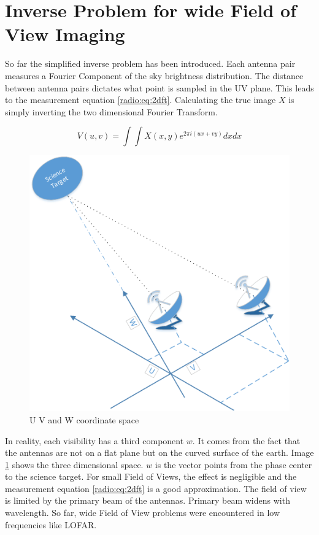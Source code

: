 \section{Inverse Problem for wide Field of View Imaging} \label{radio}
So far the simplified inverse problem has been introduced. Each antenna pair measures a Fourier Component of the sky brightness distribution. The distance between antenna pairs dictates what point is sampled in the UV plane. This leads to the measurement equation \eqref{radio:eq:2dft}. Calculating the true image $X$ is simply inverting the two dimensional Fourier Transform.

\begin{equation}\label{radio:eq:2dft}
V(u, v) = \int\int X(x, y) e^{2 \pi i (ux+vy)} dx dx
\end{equation}

\begin{figure}
	\vspace{-15pt}
	\centering
	\includegraphics[width=0.9\linewidth]{./chapters/03.radio/uvw.png}
	\caption{U V and W coordinate space}
	\label{radio:uvw}
	\vspace{-10pt}
\end{figure}

In reality, each visibility has a third component $w$. It comes from the fact that the antennas are not on a flat plane but on the curved surface of the earth. Image \ref{radio:uvw} shows the three dimensional space. $w$ is the vector points from the phase center to the science target. For small Field of Views, the effect is negligible and the measurement equation \eqref{radio:eq:2dft} is a good approximation. The field of view is limited by the primary beam of the antennas. Primary beam widens with wavelength. So far, wide Field of View problems were encountered in low frequencies like LOFAR.


